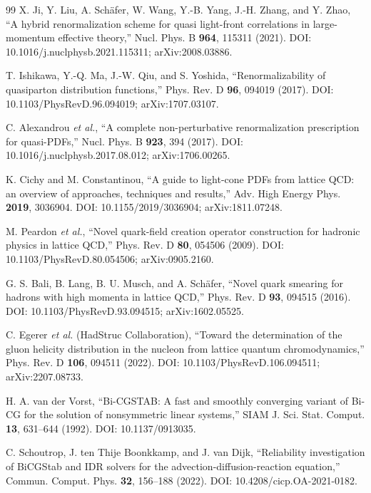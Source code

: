 \documentclass[UTF8,12pt,a4paper,twoside,openany]{ctexbook}
\begin{document}
\begin{thebibliography}{99}
X. Ji, Y. Liu, A. Schäfer, W. Wang, Y.-B. Yang, J.-H. Zhang, and Y. Zhao,
\newblock ``A hybrid renormalization scheme for quasi light-front correlations in large-momentum effective theory,''
\newblock Nucl. Phys. B \textbf{964}, 115311 (2021).
\newblock DOI: 10.1016/j.nuclphysb.2021.115311; arXiv:2008.03886.

T. Ishikawa, Y.-Q. Ma, J.-W. Qiu, and S. Yoshida,
\newblock ``Renormalizability of quasiparton distribution functions,''
\newblock Phys. Rev. D \textbf{96}, 094019 (2017).
\newblock DOI: 10.1103/PhysRevD.96.094019; arXiv:1707.03107.

C. Alexandrou \textit{et al.},
\newblock ``A complete non-perturbative renormalization prescription for quasi-PDFs,''
\newblock Nucl. Phys. B \textbf{923}, 394 (2017).
\newblock DOI: 10.1016/j.nuclphysb.2017.08.012; arXiv:1706.00265.

K. Cichy and M. Constantinou,
\newblock ``A guide to light-cone PDFs from lattice QCD: an overview of approaches, techniques and results,''
\newblock Adv. High Energy Phys. \textbf{2019}, 3036904.
\newblock DOI: 10.1155/2019/3036904; arXiv:1811.07248.

M. Peardon \textit{et al.},
\newblock ``Novel quark-field creation operator construction for hadronic physics in lattice QCD,''
\newblock Phys. Rev. D \textbf{80}, 054506 (2009).
\newblock DOI: 10.1103/PhysRevD.80.054506; arXiv:0905.2160.

G. S. Bali, B. Lang, B. U. Musch, and A. Schäfer,
\newblock ``Novel quark smearing for hadrons with high momenta in lattice QCD,''
\newblock Phys. Rev. D \textbf{93}, 094515 (2016).
\newblock DOI: 10.1103/PhysRevD.93.094515; arXiv:1602.05525.

C. Egerer \textit{et al.} (HadStruc Collaboration),
\newblock ``Toward the determination of the gluon helicity distribution in the nucleon from lattice quantum chromodynamics,''
\newblock Phys. Rev. D \textbf{106}, 094511 (2022).
\newblock DOI: 10.1103/PhysRevD.106.094511; arXiv:2207.08733.

H. A. van der Vorst,
\newblock ``Bi-CGSTAB: A fast and smoothly converging variant of Bi-CG for the solution of nonsymmetric linear systems,''
\newblock SIAM J. Sci. Stat. Comput. \textbf{13}, 631--644 (1992).
\newblock DOI: 10.1137/0913035.

C. Schoutrop, J. ten Thije Boonkkamp, and J. van Dijk,
\newblock ``Reliability investigation of BiCGStab and IDR solvers for the advection-diffusion-reaction equation,''
\newblock Commun. Comput. Phys. \textbf{32}, 156--188 (2022).
\newblock DOI: 10.4208/cicp.OA-2021-0182.

\end{thebibliography}
\end{document}
